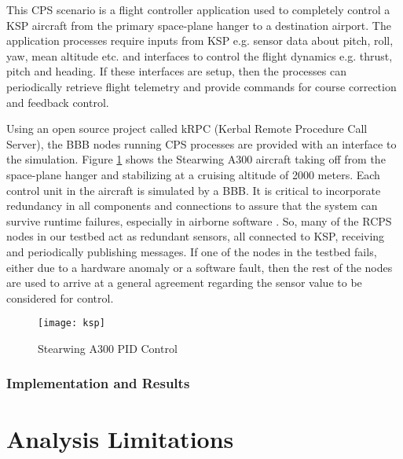This CPS scenario is a flight controller application used to completely control a KSP aircraft from the primary space-plane hanger to a destination airport. The application processes require inputs from KSP e.g. sensor data about pitch, roll, yaw, mean altitude etc. and interfaces to control the flight dynamics e.g. thrust, pitch and heading. If these interfaces are setup, then the processes can periodically retrieve flight telemetry and provide commands for course correction and feedback control.


Using an open source project called kRPC \cite{kRPC} (Kerbal Remote Procedure Call Server), the BBB nodes running CPS processes are provided with an interface to the simulation. Figure \ref{fig:ksp} shows the Stearwing A300 aircraft taking off from the space-plane hanger and stabilizing at a cruising altitude of 2000 meters. Each control unit in the aircraft is simulated by a BBB. It is critical to incorporate redundancy in all components and connections to assure that the system can survive runtime failures, especially in airborne software \cite{airborne_software} \cite{kornecki2004approaches}. So, many of the RCPS nodes in our testbed act as redundant sensors, all connected to KSP, receiving and periodically publishing messages. If one of the nodes in the testbed fails, either due to a hardware anomaly or a software fault, then the rest of the nodes are used to arrive at a general agreement regarding the sensor value to be considered for control.

\begin{figure}[h]
	\centering
	\texttt{[image: ksp]}
	\caption{Stearwing A300 PID Control}
	\label{fig:ksp}
\end{figure} 
\FloatBarrier 

\subsubsection{Implementation and Results}

\section{Analysis Limitations}

